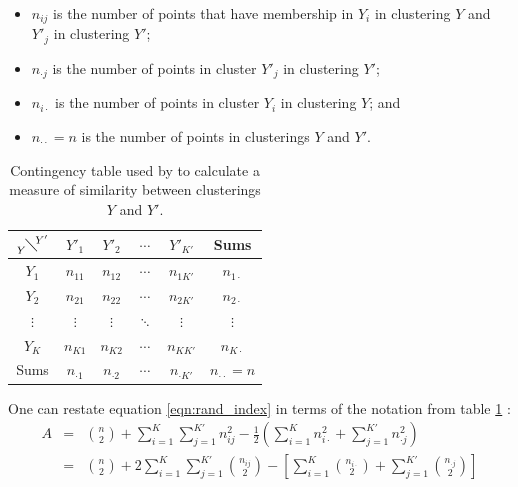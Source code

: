 \documentclass[14pt]{extarticle} %
\begin{document}
	\begin{itemize}
		\item $n_{ij}$ is the number of points that have membership in $Y_i$ in clustering $Y$ and $Y'_j$ in clustering $Y'$;
		\item $n_{\cdot j}$ is the number of points in cluster $Y'_j$ in clustering $Y'$;
		\item $n_{i \cdot}$ is the number of points in cluster $Y_i$ in clustering $Y$; and
		\item $n_{\cdot \cdot} = n$ is the number of points in clusterings $Y$ and $Y'$.
	\end{itemize}
	\begin{table}[] 
		\centering
		\begin{tabular}{c|cccc|c} 
			$ {{} \atop Y}  \!\diagdown\! ^{Y'}$	& $Y'_1$	& $Y'_2$	& $\cdots$	& $Y'_{K'}$	& Sums	\\ 
			\hline
			$Y_1$		& $n_{11}$	& $n_{12}$	& $\cdots$	& $n_{1K'}$	& $n_{1 \cdot}$	\\
			$Y_2$		& $n_{21}$	& $n_{22}$	& $\cdots$	& $n_{2K'}$	& $n_{2 \cdot}$	\\
			$\vdots$	& $\vdots$	& $\vdots$	& $\ddots$	& $\vdots$	& $\vdots$		 \\
			$Y_{K}$	& $n_{K1}$	& $n_{K2}$	& $\cdots$	& $n_{KK'}$	& $n_{K \cdot}$	\\ 
			\hline
			Sums	& $n_{\cdot 1}$	&  $n_{\cdot 2}$	& $\cdots$	& $n_{\cdot K'}$	& $n_{\cdot \cdot} = n$         
		\end{tabular}
		\caption{Contingency table used by \citet{RandObjectiveCriteriaEvaluation1971} to calculate a measure of similarity between clusterings $Y$ and $Y'$.}
		\label{table:rand_contingency}
	\end{table}
	One can restate equation \ref{eqn:rand_index} in terms of the notation from table \ref{table:rand_contingency} \citep{BrennanMeasuringagreementwhen1974}:
	\begin{eqnarray} \label{eqn:rand_index_alternative}
	A &=& \binom{n}{2} + \sum_{i=1}^K\sum_{j=1}^{K'}n_{ij}^2 - \frac{1}{2}\left(\sum_{i=1}^K n_{i\cdot}^2 + \sum_{j=1}^{K'}n_{\cdot j}^2  \right) \\
	&=& \binom{n}{2} + 2 \sum_{i=1}^{K}\sum_{j=1}^{K'}\binom{n_{ij}}{2} - \left[\sum_{i=1}^{K}\binom{n_{i \cdot}}{2} + \sum_{j=1}^{K'}\binom{n_{\cdot j}}{2}\right]%
	\end{eqnarray}
\end{document}
